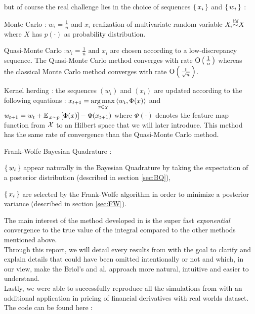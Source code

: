  but of course the real challenge lies in the choice of sequences $\left \{ \, x_i \, \right \}$ and
 $\left \{ \, w_i \, \right \}$ :
  \begin{mydescription}
  \item [Monte Carlo]: $w_i = \frac{1}{n}$ and $x_i$ realization of multivariate random variable $X_i \stackrel{iid}{\sim} X$ where $X$ has $p(\cdot)$ as probability distribution.
  \item [Quasi-Monte Carlo]:$w_i = \frac{1}{n}$ and $x_i$ are chosen according to a low-discrepancy sequence. The Quasi-Monte Carlo method converges with rate $\mathrm{O}\left( \, \frac{1}{ n} \, \right)$ whereas the classical Monte Carlo method converges with rate $\mathrm{O} \left( \, \frac{1}{\sqrt { n }} \, \right)$.
 \item [Kernel herding]: the sequences $(w_i)$ and $(x_i)$ are updated according to the following equations : $x_{t+1} = \underset { x \in \chi}{ \operatorname*{arg\,max} } \left< { w }_{ t },\Phi (x) \right> $ and $w_{t+1} = { w }_{ t }+{ \mathbb{E} \, }_{ x\sim p }\left[ \Phi (x) \right] -\Phi ({ x }_{ t+1 })$ where $\Phi(\cdot)$ denotes the feature map function from $\mathcal{X}$ to an Hilbert space that we will later introduce. This method has the same rate of convergence than the Quasi-Monte Carlo method.
  \item [Frank-Wolfe Bayesian Quadrature]:
  \begin{myitemize}[0.2cm]
\item $\left \{ \, w_i \, \right \}$ appear naturally in the Bayesian Quadrature by taking the expectation of a posterior distribution  (described in section \ref{sec:BQ}),
\item $\left \{ \, x_i \, \right \}$ are selected by the Frank-Wolfe algorithm in order to minimize a posterior variance (described in section \ref{sec:FW}).
\end{myitemize}
  \end{mydescription}
  The main interest of the method developed in \cite{FWBQ} is the super fast
  \textit{exponential} convergence to the true value of the integral compared to the other methods mentioned above.\\

\noindent
  Through this report, we will detail every results from \cite{FWBQ} with the goal
  to clarify and explain details that could have been omitted intentionally or not and which, in our view, make the Briol's and al. approach more natural, intuitive and easier
  to understand.\\

  \noindent
  Lastly, we were able to successfully reproduce all the simulations from \cite{FWBQ} with an additional application in pricing of financial derivatives with real worlds dataset. The code can be found here :



